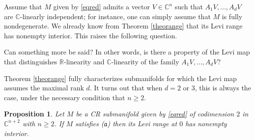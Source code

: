 \documentclass[12pt]{amsart}
\newcommand{\C}{\mathbb C}
\newcommand{\R}{\mathbb R}
\newtheorem{prop}[theo]{Proposition}
\theoremstyle{remark}
\theoremstyle{example}
\theoremstyle{definition}
\numberwithin{equation}{section}
\begin{document}
Assume that  $M$ given by \eqref{eqred} admits a vector $V \in \C^n$ such that $A_1V,\ldots,A_dV$ are $\C$-linearly independent; for instance, one can simply assume that $M$ is fully nondegenerate. We already know from Theorem \ref{theorange} that its Levi range has nonempty interior. This raises the following question. 
 
\vspace{0.1cm}

 Can  something more be said? In other words, is there a property of the Levi map that distinguishes $\R$-linearity and  $\C$-linearity  of the family $A_1V,\ldots,A_dV$? 

\vspace{0.5cm}


Theorem \ref{theorange} fully characterizes submanifolds for which the Levi map assumes the maximal rank $d$. It turns out that when $d=2$ or $3$, this is always the case, under the necessary condition  that $n \ge 2.$


\begin{prop}\label{propd=2}
Let $M$ be a CR submanifold given by \eqref{eqred} of codimension $2$ in $\C^{n+2}$ with $n\ge 2$. If $M$ satisfies ($\mathfrak{a}$)  then its Levi range at $0$ has nonempty interior. 
\end{prop}
\end{document}
